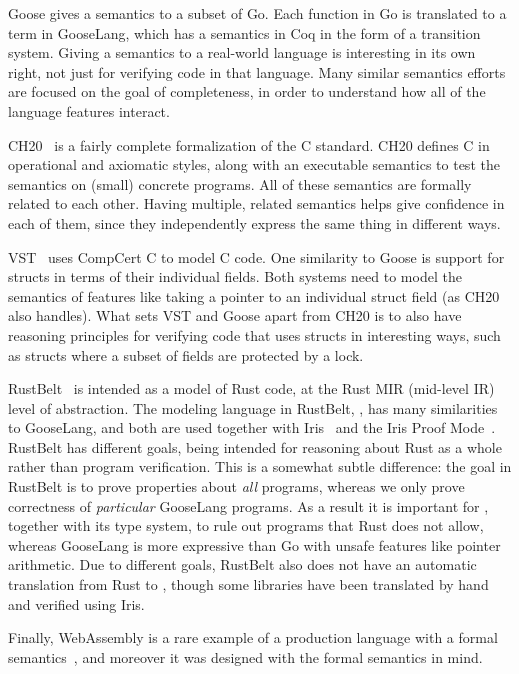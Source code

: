 Goose gives a semantics to a subset of Go. Each function in Go is translated to
a term in GooseLang, which has a semantics in Coq in the form of a transition
system. Giving a semantics to a real-world language is interesting in its own
right, not just for verifying code in that language. Many similar semantics
efforts are focused on the goal of completeness, in order to understand how all
of the language features interact.

CH20~\cite{krebbers:c-coq} is a fairly complete formalization of the C standard.
CH20 defines C in operational and axiomatic styles, along with an executable
semantics to test the semantics on (small) concrete programs. All of these
semantics are formally related to each other. Having multiple, related semantics
helps give confidence in each of them, since they independently express the same
thing in different ways.

VST~\cite{cao:vst-floyd} uses CompCert C to model C code. One similarity to
Goose is support for structs in terms of their individual fields. Both systems
need to model the semantics of features like taking a pointer to an individual
struct field (as CH20 also handles). What sets VST and Goose apart from CH20 is
to also have reasoning principles for verifying code that uses structs in
interesting ways, such as structs where a subset of fields are protected by a
lock.

RustBelt~\cite{jung:rustbelt} is intended as a model of Rust code, at the Rust
MIR (mid-level IR) level of abstraction. The modeling language in RustBelt,
\lambdarust, has many similarities to GooseLang, and both are used together with
Iris~\cite{jung:iris-1} and the Iris Proof Mode~\cite{krebbers:ipm}. RustBelt
has different goals, being intended for reasoning about Rust as a whole rather
than program verification. This is a somewhat subtle difference: the goal in
RustBelt is to prove properties about \emph{all} \lambdarust programs, whereas
we only prove correctness of \emph{particular} GooseLang programs. As a result
it is important for \lambdarust, together with its type system, to rule out
programs that Rust does not allow, whereas GooseLang is more expressive than Go
with unsafe features like pointer arithmetic. Due to different goals, RustBelt
also does not have an automatic translation from Rust to \lambdarust, though
some libraries have been translated by hand and verified using Iris.

Finally, WebAssembly is a rare example of a production language with a formal
semantics~\cite{haas:wasm}, and moreover it was designed with the formal
semantics in mind.
